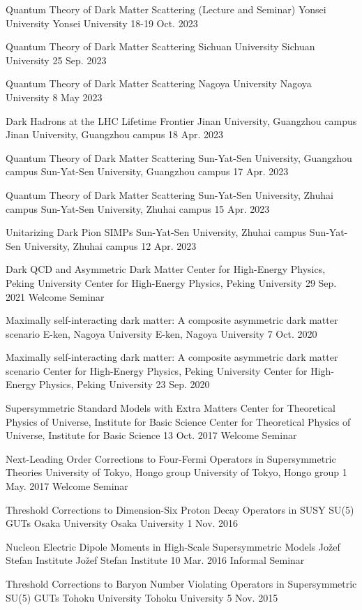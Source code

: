 \begin{talklist}
\talkentry
  {Quantum Theory of Dark Matter Scattering (Lecture and Seminar)}
  {Yonsei University}
  {Yonsei University}
  {18-19 Oct. 2023}
  {}

\talkentry
  {Quantum Theory of Dark Matter Scattering}
  {Sichuan University}
  {Sichuan University}
  {25 Sep. 2023}
  {}

\talkentry
  {Quantum Theory of Dark Matter Scattering}
  {Nagoya University}
  {Nagoya University}
  {8 May 2023}
  {}

\talkentry
  {Dark Hadrons at the LHC Lifetime Frontier}
  {Jinan University, Guangzhou campus}
  {Jinan University, Guangzhou campus}
  {18 Apr. 2023}
  {}

\talkentry
  {Quantum Theory of Dark Matter Scattering}
  {Sun-Yat-Sen University, Guangzhou campus}
  {Sun-Yat-Sen University, Guangzhou campus}
  {17 Apr. 2023}
  {}

\talkentry
  {Quantum Theory of Dark Matter Scattering}
  {Sun-Yat-Sen University, Zhuhai campus}
  {Sun-Yat-Sen University, Zhuhai campus}
  {15 Apr. 2023}
  {}

\talkentry
  {Unitarizing Dark Pion SIMPs}
  {Sun-Yat-Sen University, Zhuhai campus}
  {Sun-Yat-Sen University, Zhuhai campus}
  {12 Apr. 2023}
  {}

\talkentry
  {Dark QCD and Asymmetric Dark Matter}
  {Center for High-Energy Physics, Peking University}
  {Center for High-Energy Physics, Peking University}
  {29 Sep. 2021}
  {Welcome Seminar}

\talkentry
  {Maximally self-interacting dark matter: A composite asymmetric dark matter scenario}
  {E-ken, Nagoya University}
  {E-ken, Nagoya University}
  {7 Oct. 2020}
  {}

\talkentry
  {Maximally self-interacting dark matter: A composite asymmetric dark matter scenario}
  {Center for High-Energy Physics, Peking University}
  {Center for High-Energy Physics, Peking University}
  {23 Sep. 2020}
  {}

\talkentry
  {Supersymmetric Standard Models with Extra Matters}
  {Center for Theoretical Physics of Universe, Institute for Basic Science}
  {Center for Theoretical Physics of Universe, Institute for Basic Science}
  {13 Oct. 2017}
  {Welcome Seminar}

\talkentry
  {Next-Leading Order Corrections to Four-Fermi Operators in Supersymmetric Theories}
  {University of Tokyo, Hongo group}
  {University of Tokyo, Hongo group}
  {1 May. 2017}
  {Welcome Seminar}

\talkentry
  {Threshold Corrections to Dimension-Six Proton Decay Operators in SUSY SU(5) GUTs}
  {Osaka University}
  {Osaka University}
  {1 Nov. 2016}
  {}

\talkentry
  {Nucleon Electric Dipole Moments in High-Scale Supersymmetric Models}
  {Jo\v{z}ef Stefan Institute}
  {Jo\v{z}ef Stefan Institute}
  {10 Mar. 2016}
  {Informal Seminar}

\talkentry
  {Threshold Corrections to Baryon Number Violating Operators in Supersymmetric SU(5) GUTs}
  {Tohoku University}
  {Tohoku University}
  {5 Nov. 2015}
  {}

\end{talklist}
